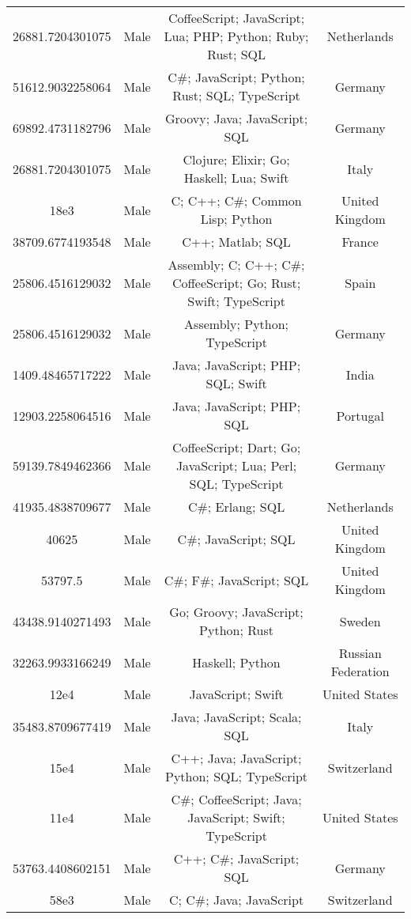 \begin{center}
\begin{tabular}{ |c|c|c|c| }
26881.7204301075  &  Male  &  CoffeeScript; JavaScript; Lua; PHP; Python; Ruby; Rust; SQL  &  Netherlands  \\ 
51612.9032258064  &  Male  &  C\#; JavaScript; Python; Rust; SQL; TypeScript  &  Germany  \\ 
69892.4731182796  &  Male  &  Groovy; Java; JavaScript; SQL  &  Germany  \\ 
26881.7204301075  &  Male  &  Clojure; Elixir; Go; Haskell; Lua; Swift  &  Italy  \\ 
18e3  &  Male  &  C; C++; C\#; Common Lisp; Python  &  United Kingdom  \\ 
38709.6774193548  &  Male  &  C++; Matlab; SQL  &  France  \\ 
25806.4516129032  &  Male  &  Assembly; C; C++; C\#; CoffeeScript; Go; Rust; Swift; TypeScript  &  Spain  \\ 
25806.4516129032  &  Male  &  Assembly; Python; TypeScript  &  Germany  \\ 
1409.48465717222  &  Male  &  Java; JavaScript; PHP; SQL; Swift  &  India  \\ 
12903.2258064516  &  Male  &  Java; JavaScript; PHP; SQL  &  Portugal  \\ 
59139.7849462366  &  Male  &  CoffeeScript; Dart; Go; JavaScript; Lua; Perl; SQL; TypeScript  &  Germany  \\ 
41935.4838709677  &  Male  &  C\#; Erlang; SQL  &  Netherlands  \\ 
40625  &  Male  &  C\#; JavaScript; SQL  &  United Kingdom  \\ 
53797.5  &  Male  &  C\#; F\#; JavaScript; SQL  &  United Kingdom  \\ 
43438.9140271493  &  Male  &  Go; Groovy; JavaScript; Python; Rust  &  Sweden  \\ 
32263.9933166249  &  Male  &  Haskell; Python  &  Russian Federation  \\ 
12e4  &  Male  &  JavaScript; Swift  &  United States  \\ 
35483.8709677419  &  Male  &  Java; JavaScript; Scala; SQL  &  Italy  \\ 
15e4  &  Male  &  C++; Java; JavaScript; Python; SQL; TypeScript  &  Switzerland  \\ 
11e4  &  Male  &  C\#; CoffeeScript; Java; JavaScript; Swift; TypeScript  &  United States  \\ 
53763.4408602151  &  Male  &  C++; C\#; JavaScript; SQL  &  Germany  \\ 
58e3  &  Male  &  C; C\#; Java; JavaScript  &  Switzerland  \\ 

\end{tabular}
\end{center}
